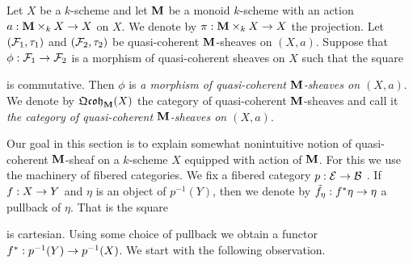 \begin{definition}
Let $X$ be a $k$-scheme and let $\mathbf{M}$ be a monoid $k$-scheme with an action $a:\mathbf{M}\times_kX\rightarrow X$ on $X$. We denote by $\pi:\mathbf{M}\times_kX\rightarrow X$ the projection. Let $({\mathcal F}_1,\tau_1)$ and $({\mathcal F}_2,\tau_2)$ be quasi-coherent $\mathbf{M}$-sheaves on $(X,a)$. Suppose that $\phi:{\mathcal F}_1\rightarrow {\mathcal F}_2$ is a morphism of quasi-coherent sheaves on $X$ such that the square
\begin{center}
\end{center}
is commutative. Then $\phi$ is \textit{a morphism of quasi-coherent $\mathbf{M}$-sheaves on $(X,a)$}. We denote by $\mathfrak{Qcoh}_{\mathbf{M}}(X)$ the category of quasi-coherent $\mathbf{M}$-sheaves and call it \textit{the category of quasi-coherent $\mathbf{M}$-sheaves on $(X,a)$}.
\end{definition}
\noindent
Our goal in this section is to explain somewhat nonintuitive notion of quasi-coherent $\mathbf{M}$-sheaf on a $k$-scheme $X$ equipped with action of $\mathbf{M}$. For this we use the machinery of fibered categories. We fix a fibered category $p:{\mathcal E} \rightarrow {\mathcal B}$ . If $f:X\rightarrow Y$ and $\eta$ is an object of $p^{-1}(Y)$, then we denote by $\tilde{f}_{\eta}:f^*\eta\rightarrow \eta$ a pullback of $\eta$. That is the square
\begin{center}
\end{center}
is cartesian. Using some choice of pullback we obtain a functor $f^*:p^{-1}(Y)\rightarrow p^{-1}(X)$. We start with the following observation.

